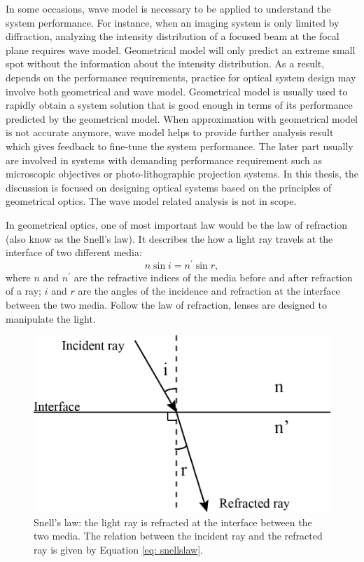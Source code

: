  
In some occasions, wave model is necessary to be applied to understand the system performance. For instance, when an imaging system is only limited by diffraction, analyzing the intensity distribution of a focused beam at the focal plane requires wave model. Geometrical model will only predict an extreme small spot without the information about the intensity distribution. As a result, depends on the performance requirements, practice for optical system design may involve both geometrical and wave model. Geometrical model is usually used to rapidly obtain a system solution that is good enough in terms of its performance predicted by the geometrical model. When approximation with geometrical model is not accurate anymore, wave model helps to provide further analysis result which gives feedback to fine-tune the system performance. The later part usually are involved in systems with demanding performance requirement such as microscopic objectives or photo-lithographic projection systems. In this thesis, the discussion is focused on designing optical systems based on the principles of geometrical optics. The wave model related analysis is not in scope.  


In geometrical optics, one of most important law would be the law of refraction (also know as the Snell's law). It describes the how a light ray travels at the interface of two different media:
\begin{equation}
n \sin i = n^\prime \sin r,
\label{eq: snellslaw}
\end{equation}
where $n$ and $n^\prime$ are the refractive indices of the media before and after refraction of a ray; $i$ and $r$ are the angles of the incidence and refraction at the interface between the two media. Follow the law of refraction, lenses are designed to manipulate the light.
\begin{figure}
    \centering
    \includegraphics[scale=0.65]{chapter-1/figures/snellslaw.png}
    \caption{Snell's law: the light ray is refracted at the interface between the two media. The relation between the incident ray and the refracted ray is given by Equation \ref{eq: snellslaw}.}
    \label{fig: snellslaw}
\end{figure} 


